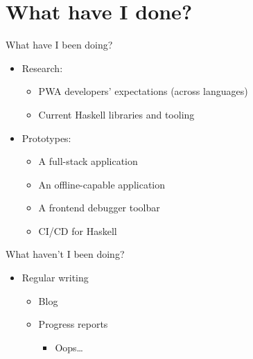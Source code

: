 \documentclass[presentation]{beamer}
\begin{document}
\section{What have I done?}
\label{sec:org23252d4}
\begin{frame}[label={sec:org8633cd4}]{What have I been doing?}
\begin{itemize}
\item Research:
\begin{itemize}
\item PWA developers' expectations (across languages)
\item Current Haskell libraries and tooling
\end{itemize}
\end{itemize}

\pause

\begin{itemize}
\item Prototypes:
\begin{itemize}
\item A full-stack application
\item An offline-capable application
\item A frontend debugger toolbar
\item CI/CD for Haskell
\end{itemize}
\end{itemize}
\end{frame}

\begin{frame}[label={sec:org7092512}]{What haven't I been doing?}
\pause

\begin{itemize}
\item Regular writing
\begin{itemize}
\item Blog
\item Progress reports   \pause
\begin{itemize}
\item Oops\ldots{}
\end{itemize}
\end{itemize}
\end{itemize}
\end{frame}
\end{document}
